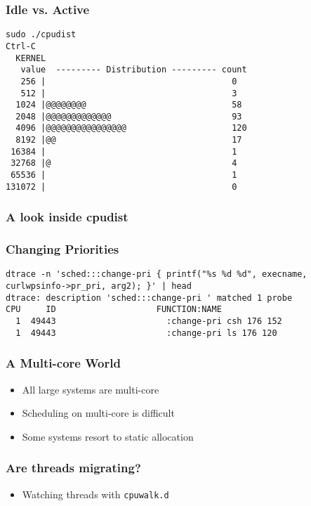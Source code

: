 \documentclass[pdftex]{beamer}
\begin{document}
\begin{frame}[fragile]
  \frametitle{Idle vs. Active}
\begin{verbatim}
sudo ./cpudist
Ctrl-C
  KERNEL 
   value  --------- Distribution --------- count    
   256 |                                     0        
   512 |                                     3        
  1024 |@@@@@@@@                             58       
  2048 |@@@@@@@@@@@@@                        93       
  4096 |@@@@@@@@@@@@@@@@                     120      
  8192 |@@                                   17       
 16384 |                                     1        
 32768 |@                                    4        
 65536 |                                     1        
131072 |                                     0        
\end{verbatim}
\end{frame}

\begin{frame}
  \frametitle{A look inside cpudist}
  
\end{frame}

\begin{frame}[fragile]
  \frametitle{Changing Priorities}
\begin{lstlisting}
dtrace -n 'sched:::change-pri { printf("%s %d %d", execname, curlwpsinfo->pr_pri, arg2); }' | head
dtrace: description 'sched:::change-pri ' matched 1 probe
CPU     ID                    FUNCTION:NAME
  1  49443                      :change-pri csh 176 152
  1  49443                      :change-pri ls 176 120
\end{lstlisting}
\end{frame}

\begin{frame}
  \frametitle{A Multi-core World}
  \begin{itemize}
  \item All large systems are multi-core
  \item Scheduling on multi-core is difficult
  \item Some systems resort to static allocation
  \end{itemize}
\end{frame}

\begin{frame}[fragile]
  \frametitle{Are threads migrating?}
  \begin{itemize}
  \item Watching threads with \verb+cpuwalk.d+
  \end{itemize}
\end{frame}
\end{document}
